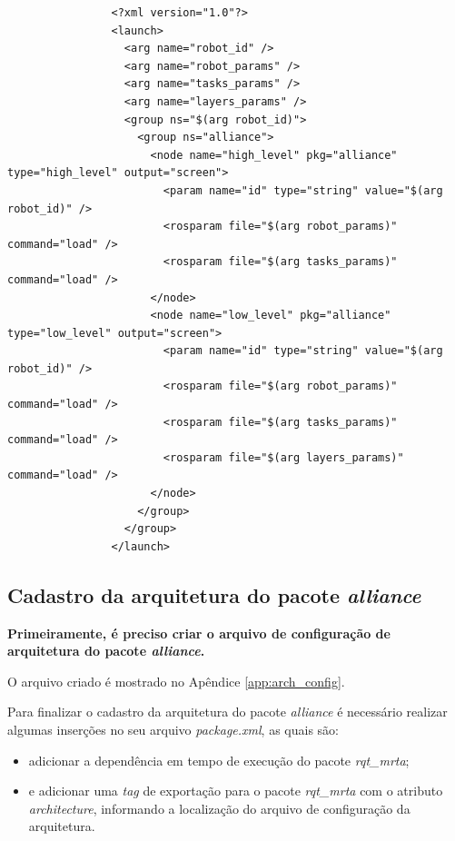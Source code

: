             \begin{lstlisting}
                <?xml version="1.0"?>
                <launch>
                  <arg name="robot_id" />
                  <arg name="robot_params" />
                  <arg name="tasks_params" />
                  <arg name="layers_params" />
                  <group ns="$(arg robot_id)">
                    <group ns="alliance">
                      <node name="high_level" pkg="alliance" type="high_level" output="screen">
                        <param name="id" type="string" value="$(arg robot_id)" />
                        <rosparam file="$(arg robot_params)" command="load" />
                        <rosparam file="$(arg tasks_params)" command="load" />
                      </node>
                      <node name="low_level" pkg="alliance" type="low_level" output="screen">
                        <param name="id" type="string" value="$(arg robot_id)" />
                        <rosparam file="$(arg robot_params)" command="load" />
                        <rosparam file="$(arg tasks_params)" command="load" />
                        <rosparam file="$(arg layers_params)" command="load" />
                      </node>
                    </group>
                  </group>
                </launch>
            \end{lstlisting}
            
        \subsection{Cadastro da arquitetura do pacote \textit{alliance}}
            \textbf{\color{red}Primeiramente, é preciso criar o arquivo de configuração de arquitetura do pacote \textit{alliance}.}
            
            O arquivo criado é mostrado no Apêndice \ref{app:arch_config}.
            
            Para finalizar o cadastro da arquitetura do pacote \textit{alliance} é necessário realizar algumas inserções no seu arquivo \textit{package.xml}, as quais são: 
            
            \begin{itemize}
                \item adicionar a dependência em tempo de execução do pacote \textit{rqt\_mrta};
                \item e adicionar uma \textit{tag} de exportação para o pacote \textit{rqt\_mrta} com o atributo \textit{architecture}, informando a localização do arquivo de configuração da arquitetura.
            \end{itemize}
            
